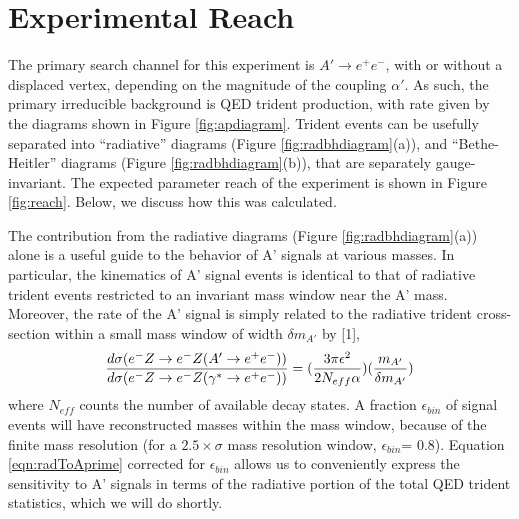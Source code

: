\section{Experimental Reach}

The primary search channel for this experiment is $A' \rightarrow e^+ e^-$, with or without
 a displaced vertex, depending on the magnitude of the coupling $\alpha'$. As such, 
the primary irreducible 
background is QED trident production, with rate given by the diagrams shown in 
Figure \ref{fig:apdiagram}. Trident events can be usefully separated into ``radiative'' diagrams 
(Figure \ref{fig:radbhdiagram}(a)), and ``Bethe-Heitler'' diagrams (Figure \ref{fig:radbhdiagram}(b)), that are separately 
gauge-invariant.  The expected parameter reach of the experiment is shown in Figure \ref{fig:reach}.  Below, we discuss how this was calculated.  

The contribution from the radiative diagrams (Figure \ref{fig:radbhdiagram}(a)) alone is a useful guide 
to the behavior of A' signals at various masses.  In particular, the kinematics of A' 
signal events is identical to that of radiative trident events restricted to an invariant 
mass window near the A' mass.  Moreover, the rate of the A' signal is simply related to 
the radiative trident cross-section within a small mass window of width $\delta m_{A'}$  
by [1],
\begin{equation}
 {{d\sigma(e^-Z\rightarrow e^-Z(A'\rightarrow e^+e^-))} \over
    {d\sigma(e^-Z\rightarrow e^-Z(\gamma^*\rightarrow e^+e^-))}} =
    ({{3\pi \epsilon^2} \over {2N_{eff}\alpha}}) ({{m_{A'}} \over {\delta m_{A'}}})
  \label{eqn:radToAprime}
\end{equation}
where $N_{eff}$ counts the number of available decay states.  A fraction $\epsilon_{bin}$ 
of signal events will have reconstructed masses within the mass window, because of the 
finite mass resolution  (for a $2.5 \times \sigma$ mass resolution window, 
$\epsilon_{bin}$= 0.8).  Equation \ref{eqn:radToAprime} corrected for $\epsilon_{bin}$ allows us to 
conveniently express the sensitivity to A' signals in terms of the radiative portion 
of the total QED trident statistics, which we will do shortly. 

